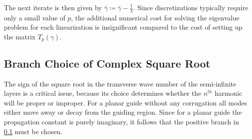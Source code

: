 The next iterate is then given by
$\bar{\gamma} \coloneqq \bar{\gamma}-\frac{1}{\lambda}$. Since discretizations typically
require only a small value of $p$, the additional numerical cost for
solving the eigenvalue problem for each linearization is insignificant
compared to the cost of setting up the matrix $T_p(\gamma)$.

\subsection{Branch Choice of Complex Square Root}
The sign of the square root in the transverse wave number of the
semi-infinite layers is a critical issue, because its choice
determines whether the $n^{th}$ harmonic will be proper or improper.
For a planar guide without any corrugation all modes either move away
or decay from the guiding region. Since for a planar guide the
propagation constant is purely imaginary, it follows that the positive
branch in \ref{} must be chosen.

